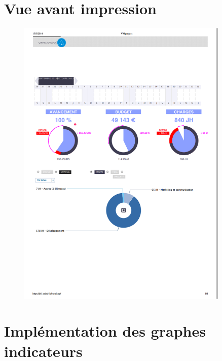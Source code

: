 \documentclass[12pt]{report}
\begin{document}
\begin{appendices}
	\chapter{Vue avant impression}
	
	\begin{figure}[H]
	\centering
	\includegraphics[width=0.9\textwidth]{pictures/matthieu/m_imprimable.png}
	\caption{}
	\label{m7}
\end{figure}

	\chapter{Implémentation des graphes indicateurs}
	

\end{appendices}
\end{document}
